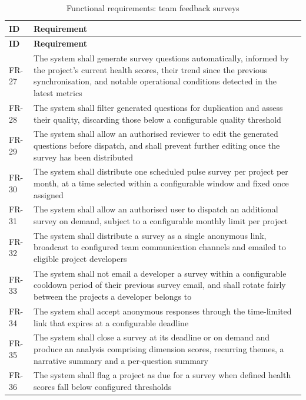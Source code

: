 \begin{longtable}{
  >{\raggedright\arraybackslash}p{}
  >{\raggedright\arraybackslash}p{}
}
\caption{Functional requirements: team feedback surveys}
\label{tab:fr-surveys}\\
\toprule
\textbf{ID} & \textbf{Requirement} \\
\midrule
\endfirsthead
\toprule
\textbf{ID} & \textbf{Requirement} \\
\midrule
\endhead
\bottomrule
\endlastfoot
FR-27 & The system shall generate survey questions automatically, informed by the
project's current health scores, their trend since the previous synchronisation, and notable operational conditions detected in the latest metrics \\
\addlinespace FR-28 & The system shall filter generated questions for duplication and assess their
quality, discarding those below a configurable quality threshold \\
\addlinespace
FR-29 & The system shall allow an authorised reviewer to edit the generated questions before dispatch, and shall prevent further editing once the survey has been distributed \\ \addlinespace                                                               FR-30 & The system shall distribute one scheduled pulse survey per project per month, at a time selected within a configurable window and fixed once assigned \\
\addlinespace FR-31 & The system shall allow an authorised user to dispatch an additional survey on
demand, subject to a configurable monthly limit per project \\
\addlinespace
FR-32 & The system shall distribute a survey as a single anonymous link, broadcast to
configured team communication channels and emailed to eligible project developers \\
\addlinespace                                                                        
FR-33 & The system shall not email a developer a survey within a configurable
cooldown period of their previous survey email, and shall rotate fairly between the  
projects a developer belongs to \\
\addlinespace                                                                        
FR-34 & The system shall accept anonymous responses through the time-limited link that
expires at a configurable deadline \\                                                
\addlinespace
FR-35 & The system shall close a survey at its deadline or on demand and produce an  
analysis comprising dimension scores, recurring themes, a narrative summary and a
per-question summary \\                                                              
\addlinespace
FR-36 & The system shall flag a project as due for a survey when defined health      scores fall below configured thresholds \\
\end{longtable}

